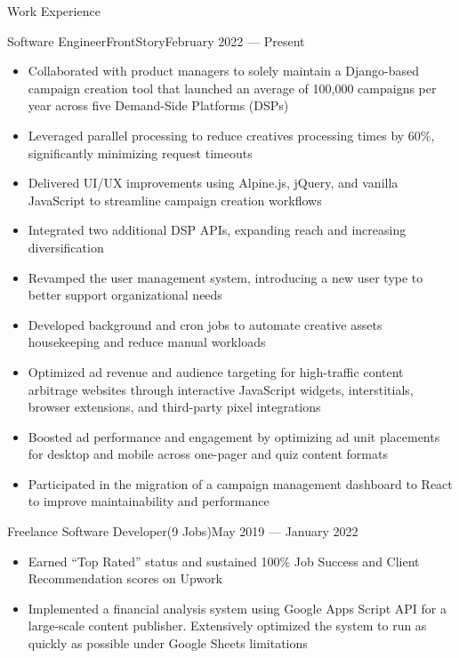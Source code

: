 \documentclass[]{mcdowellcv}
\begin{document}
	\makeheader
	
	
	\begin{cvsection}{Work Experience}
		\begin{cvsubsection}{Software Engineer}{FrontStory}{February 2022 — Present}
			\begin{itemize}
				\item Collaborated with product managers to solely maintain a Django-based campaign creation tool that launched an average of 100,000 campaigns per year across five Demand-Side Platforms (DSPs)
				\item Leveraged parallel processing to reduce creatives processing times by 60\%, significantly minimizing request timeouts
				\item Delivered UI/UX improvements using Alpine.js, jQuery, and vanilla JavaScript to streamline campaign creation workflows
				\item Integrated two additional DSP APIs, expanding reach and increasing diversification
				\item Revamped the user management system, introducing a new user type to better support organizational needs
				\item Developed background and cron jobs to automate creative assets housekeeping and reduce manual workloads
				\item Optimized ad revenue and audience targeting for high-traffic content arbitrage websites through interactive JavaScript widgets, interstitials, browser extensions, and third-party pixel integrations
				\item Boosted ad performance and engagement by optimizing ad unit placements for desktop and mobile across one-pager and quiz content formats
				\item Participated in the migration of a campaign management dashboard to React to improve maintainability and performance
			\end{itemize}
		\end{cvsubsection}
		\begin{cvsubsection}{Freelance Software Developer}{(9 Jobs)}{May 2019 — January 2022}
			\begin{itemize}
				\item Earned “Top Rated” status and sustained 100\% Job Success and Client Recommendation scores on Upwork
				\item Implemented a financial analysis system using Google Apps Script API for a large-scale content publisher. Extensively optimized the system to run as quickly as possible under Google Sheets limitations
			\end{itemize}
		\end{cvsubsection}
	\end{cvsection}
	
\end{document}
